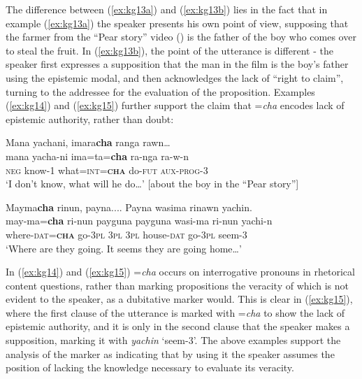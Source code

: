 \documentclass[output=paper]{langscibook}
\begin{document}
The difference between (\ref{ex:kg13a}) and (\ref{ex:kg13b}) lies in the fact that in example (‎\ref{ex:kg13a}) the speaker presents his own point of view, supposing that the farmer from the “Pear story” video (\citealt{Chafe1980}) is the father of the boy who comes over to steal the fruit. In (\ref{ex:kg13b}), the point of the utterance is different - the speaker first expresses a supposition that the man in the film is the boy’s father using the epistemic modal, and then acknowledges the lack of “right to claim”, turning to the addressee for the evaluation of the proposition. Examples (\ref{ex:kg14}) and (\ref{ex:kg15}) further support the claim that =\textit{cha} encodes lack of epistemic authority, rather than doubt:

\begin{exe}
	\ex \label{ex:kg14}
	\glll Mana yachani, imara\textbf{cha} ranga rawn…\\
	mana yacha-ni ima=ta=\textbf{cha} ra-nga ra-w-n\\
	\textsc{neg}   know-1  what=\textsc{int}=\textbf{\textsc{cha}} do-\textsc{fut} \textsc{aux}-\textsc{prog}-3\\
	\trans ‘I don’t know, what will he do…’ [about the boy in the “Pear story”] \newline [in\_24092014\_01 026]
\end{exe}

\begin{exe}
	\ex \label{ex:kg15}
	\glll Mayma\textbf{cha} rinun, payna.... Payna wasima rinawn yachin.\\
	may-ma=\textbf{cha} ri-nun payguna  payguna wasi-ma ri-nun yachi-n\\
	where-\textsc{dat}=\textbf{\textsc{cha}}  go-3\textsc{pl} 3\textsc{pl} 3\textsc{pl} house-\textsc{dat}  go-3\textsc{pl}  seem-3\\
	\trans ‘Where are they going. It seems they are going home…’ \newline [el\_24092014\_02 028]
\end{exe}

In (\ref{ex:kg14}) and (\ref{ex:kg15}) =\textit{cha} occurs on interrogative pronouns in rhetorical content questions, rather than marking propositions the veracity of which is not evident to the speaker, as a dubitative marker would. This is clear in (\ref{ex:kg15}), where the first clause of the utterance is marked with =\textit{cha} to show the lack of epistemic authority, and it is only in the second clause that the speaker makes a supposition, marking it with \textit{yachin} `seem-3'. The above examples support the analysis of the marker as indicating that by using it the speaker assumes the position of lacking the knowledge necessary to evaluate its veracity.
\end{document}
